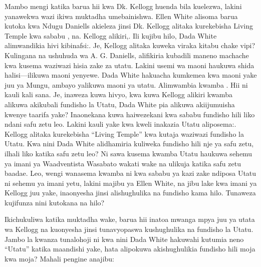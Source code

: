 Mambo mengi katika barua hii kwa Dk. Kellogg huenda bila kuelezwa, lakini yanawekwa wazi ikiwa muktadha umebainishwa. Ellen White alisoma barua kutoka kwa Ndugu Daniells akieleza jinsi Dk. Kellogg alitaka kurekebisha Living Temple kwa sababu , na. Kellogg alikiri,. Ili kujibu hilo, Dada White alimwandikia hivi kibinafsi:. Je, Kellogg alitaka kuweka viraka kitabu chake vipi? Kulingana na ushuhuda wa A. G. Daniells, alifikiria kubadili maneno machache kwa kusema waziwazi hisia zake za utatu. Lakini usemi wa maoni haukuwa shida halisi—ilikuwa maoni yenyewe. Dada White hakuacha kumkemea kwa maoni yake juu ya Mungu, ambayo yalikuwa maoni ya utatu. Alimwambia kwamba . Hii ni kauli kali sana. Je, inaweza kuwa hivyo, kwa kuwa Kellogg alikiri kwamba alikuwa akikubali fundisho la Utatu, Dada White pia alikuwa akiijumuisha kwenye taarifa yake? Inaonekana kuwa haiwezekani kwa sababu fundisho hili liko ndani safu zetu leo. Lakini kauli yake kwa kweli inakazia Utatu aliposema:. Kellogg alitaka kurekebisha “Living Temple” kwa kutaja waziwazi fundisho la Utatu. Kwa nini Dada White alidhamiria kuliweka fundisho hili nje ya safu zetu, ilhali liko katika safu zetu leo? Ni sawa kusema kwamba Utatu haukuwa sehemu ya imani ya Waadventista Wasabato wakati wake na ulikuja katika safu zetu baadae. Leo, wengi wanasema kwamba ni kwa sababu ya kazi zake ndiposa Utatu ni sehemu ya imani yetu, lakini majibu ya Ellen White, na jibu lake kwa imani ya Kellogg juu yake, inaonyesha jinsi alishughulika na fundisho kama hilo. Tunaweza kujifunza nini kutokana na hilo?


Ikichukuliwa katika muktadha wake, barua hii inatoa mwanga mpya juu ya utata wa Kellogg na kuonyesha jinsi tunavyopaswa kushughulika na fundisho la Utatu. Jambo la kwanza tunalohoji ni kwa nini Dada White hakuwahi kutumia neno “Utatu” katika maandishi yake, hata alipokuwa akishughulikia fundisho hili moja kwa moja? Mahali pengine anajibu:


